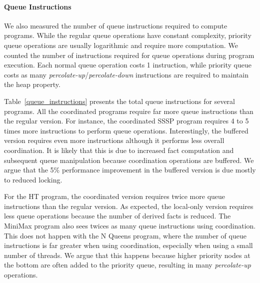 \paragraph{Queue Instructions}

We also measured the number of queue instructions required to compute programs.
While the regular queue operations have constant complexity, priority queue
operations are usually logarithmic and require more computation. We counted the
number of instructions required for queue operations during program execution.
Each normal queue operation costs 1 instruction, while priority queue costs as
many \emph{percolate-up}/\emph{percolate-down} instructions are required to maintain the heap property.

Table~\ref{queue_instructions} presents the total queue instructions for several
programs. All the coordinated programs require far more queue instructions than
the regular version. For instance, the coordinated SSSP program requires 4 to 5
times more instructions to perform queue operations. Interestingly, the buffered
version requires even more instructions although it performs less overall
coordination. It is likely that this is due to increased fact computation and
subsequent queue manipulation because coordination operations are buffered.
We argue that the 5\% performance improvement in the
buffered version is due mostly to reduced locking.

For the HT program, the coordinated version requires twice more queue
instructions than the regular version. As expected, the local-only version
requires less queue operations because the number of derived facts is reduced.
The MiniMax program also sees twices as many queue instructions using
coordination. This does not happen with the N Queens program, where the number
of queue instructions is far greater when using coordination, especially when
using a small number of threads. We argue that this happens because higher
priority nodes at the bottom are often added to the priority queue, resulting in
many \emph{percolate-up} operations.

